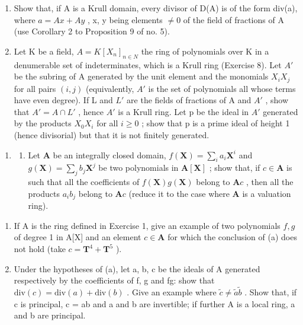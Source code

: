 \begin{enumerate}
\def\labelenumi{(\alph{enumi})}
\item
  Show that, if A is a Krull domain, every divisor of D(A) is of the form div(a), where \(a = Ax + Ay\) , x, y being elements \(\neq 0\) of the field of fractions of A (use Corollary 2 to Proposition 9 of no. 5).
\item
  Let K be a field, \(A = K[X_{n}]_{n \in N}\) the ring of polynomials over K in a denumerable set of indeterminates, which is a Krull ring (Exercise 8). Let \(A'\) be the subring of A generated by the unit element and the monomials \(X_{i}X_{j}\) for all pairs \((i,j)\) (equivalently, \(A'\) is the set of polynomials all whose terms have even degree). If L and \(L'\) are the fields of fractions of A and \(A'\) , show that \(A' = A \cap L'\) , hence \(A'\) is a Krull ring. Let p be the ideal in \(A'\) generated by the products \(X_{0}X_{i}\) for all \(i \geqslant 0\) ; show that p is a prime ideal of height 1 (hence divisorial) but that it is not finitely generated.
\end{enumerate}

\begin{enumerate}
\def\labelenumi{\arabic{enumi}.}
\setcounter{enumi}{11}
\tightlist
\item
  \begin{enumerate}
  \def\labelenumii{(\alph{enumii})}
  \tightlist
  \item
    Let \(\mathbf{A}\) be an integrally closed domain, \(f(\mathbf{X}) = \sum_{i} a_i \mathbf{X}^i\) and \(g(\mathbf{X}) = \sum_{j} b_j \mathbf{X}^j\) be two polynomials in \(\mathbf{A}[\mathbf{X}]\) ; show that, if \(c \in \mathbf{A}\) is such that all the coefficients of \(f(\mathbf{X}) g(\mathbf{X})\) belong to \(\mathbf{A}c\) , then all the products \(a_i b_j\) belong to \(\mathbf{A}c\) (reduce it to the case where \(\mathbf{A}\) is a valuation ring).
  \end{enumerate}
\end{enumerate}

\begin{enumerate}
\def\labelenumi{(\alph{enumi})}
\setcounter{enumi}{1}
\item
  If A is the ring defined in Exercise 1, give an example of two polynomials \(f, g\) of degree 1 in A{[}X{]} and an element \(c \in \mathbf{A}\) for which the conclusion of (a) does not hold (take \(c = \mathbf{T}^4 + \mathbf{T}^5\) ).
\item
  Under the hypotheses of (a), let a, b, c be the ideals of A generated respectively by the coefficients of f, g and fg: show that \(\text{div}(c) = \text{div}(a) + \text{div}(b)\) . Give an example where \(\tilde{c} \neq \tilde{a}\tilde{b}\) . Show that, if c is principal, c = ab and a and b are invertible; if further A is a local ring, a and b are principal.
\end{enumerate}

